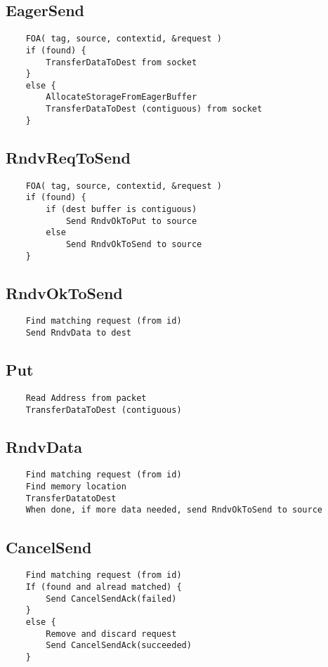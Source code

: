 \documentclass{article}
\begin{document}
\subsection{EagerSend}
\begin{verbatim}
    FOA( tag, source, contextid, &request )
    if (found) {
        TransferDataToDest from socket
    }
    else {
        AllocateStorageFromEagerBuffer
        TransferDataToDest (contiguous) from socket
    }
\end{verbatim}

\subsection{RndvReqToSend}
\begin{verbatim}
    FOA( tag, source, contextid, &request )
    if (found) {
        if (dest buffer is contiguous)
            Send RndvOkToPut to source
        else
            Send RndvOkToSend to source
    }
\end{verbatim}

\subsection{RndvOkToSend}
\begin{verbatim}
    Find matching request (from id)
    Send RndvData to dest
\end{verbatim}

\subsection{Put}
\begin{verbatim}
    Read Address from packet
    TransferDataToDest (contiguous)
\end{verbatim}

\subsection{RndvData}
\begin{verbatim}
    Find matching request (from id)
    Find memory location
    TransferDatatoDest
    When done, if more data needed, send RndvOkToSend to source
\end{verbatim}

\subsection{CancelSend}
\begin{verbatim}
    Find matching request (from id)
    If (found and alread matched) {
        Send CancelSendAck(failed)
    }
    else {
        Remove and discard request
        Send CancelSendAck(succeeded)
    }
 \end{verbatim}
\end{document}
